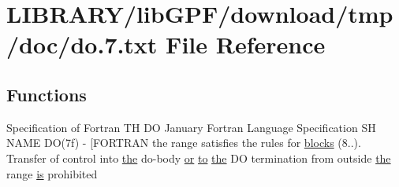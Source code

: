 \hypertarget{do_87_8txt}{}\section{L\+I\+B\+R\+A\+R\+Y/lib\+G\+P\+F/download/tmp/doc/do.7.txt File Reference}
\label{do_87_8txt}
\subsection*{Functions}
\begin{DoxyCompactItemize}
\item 
Specification of Fortran TH DO January Fortran Language Specification SH N\+A\+ME DO(7f) -\/ \mbox{[}\+F\+O\+R\+T\+R\+A\+N the range satisfies the rules for \hyperlink{do_87_8txt_addf9a264ccc8c65a4995cf34906eff5c}{blocks} (8..). Transfer of control into \hyperlink{M__stopwatch_83_8txt_a0f266597de2e57eb3aa964927bb30e14}{the} do-\/body \hyperlink{what__overview_81_8txt_a08ee81dca94cf4ba88d4a64051e232d5}{or} \hyperlink{M__stopwatch_83_8txt_a97209fd3e34ef701c0a9734280779cbb}{to} \hyperlink{M__stopwatch_83_8txt_a0f266597de2e57eb3aa964927bb30e14}{the} DO termination from outside \hyperlink{M__stopwatch_83_8txt_a0f266597de2e57eb3aa964927bb30e14}{the} range \hyperlink{intro__blas1_83_8txt_a42a91df93f840595de3019ceb5d1df23}{is} prohibited
\item 

\end{DoxyCompactItemize}
